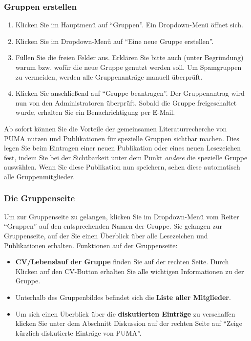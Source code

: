 \subsubsection{Gruppen erstellen}
\begin{enumerate}
    \item Klicken Sie im Hauptmenü auf \enquote{Gruppen}. Ein Dropdown-Menü öffnet sich.
    \item Klicken Sie im Dropdown-Menü auf \enquote{Eine neue Gruppe erstellen}.
    \item Füllen Sie die freien Felder aus. Erklären Sie bitte auch (unter Begründung) warum bzw. wofür die neue Gruppe genutzt werden soll. Um Spamgruppen zu vermeiden, werden alle Gruppenanträge manuell überprüft. 
    \item Klicken Sie anschließend auf \enquote{Gruppe beantragen}. Der Gruppenantrag wird nun von den Administratoren überprüft. Sobald die Gruppe freigeschaltet wurde, erhalten Sie ein Benachrichtigung per E-Mail.
\end{enumerate}
Ab sofort können Sie die Vorteile der gemeinsamen Literaturrecherche von PUMA nutzen und Publikationen  für spezielle Gruppen sichtbar machen. Dies legen Sie beim Eintragen einer neuen Publikation oder eines neuen Lesezeichen fest, indem Sie bei der Sichtbarkeit unter dem Punkt \textit{andere} die spezielle Gruppe auswählen. Wenn Sie diese Publikation nun speichern, sehen diese automatisch alle Gruppenmitglieder.
\subsubsection{Die Gruppenseite}
Um zur Gruppenseite zu gelangen, klicken Sie im Dropdown-Menü vom Reiter  \enquote{Gruppen} auf den entsprechenden Namen der Gruppe. Sie gelangen zur Gruppenseite, auf der Sie einen Überblick über alle Lesezeichen und Publikationen erhalten.%
\newline\newline
Funktionen auf der Gruppenseite:
\begin{itemize}
\item \textbf{CV/Lebenslauf der Gruppe} finden Sie auf der rechten Seite. Durch Klicken auf den CV-Button erhalten Sie alle wichtigen Informationen zu der Gruppe.
\item Unterhalb des Gruppenbildes befindet sich die \textbf{Liste aller Mitglieder}. 
\item Um sich einen Überblick über die \textbf{diskutierten Einträge} zu verschaffen klicken Sie unter dem Abschnitt Diskussion auf der rechten Seite auf \enquote{Zeige kürzlich diskutierte Einträge von PUMA}. 
\end{itemize}
 
